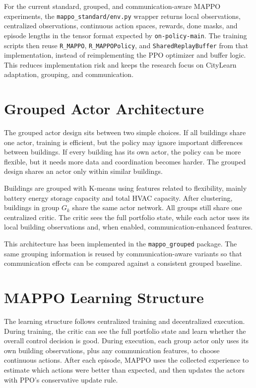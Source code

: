 For the current standard, grouped, and communication-aware MAPPO experiments,
the \texttt{mappo\_standard/env.py} wrapper returns local observations,
centralized observations, continuous action spaces, rewards, done masks, and
episode lengths in the tensor format expected by \texttt{on-policy-main}. The
training scripts then reuse \texttt{R\_MAPPO}, \texttt{R\_MAPPOPolicy}, and
\texttt{SharedReplayBuffer} from that implementation, instead of reimplementing
the PPO optimizer and buffer logic. This reduces implementation risk and keeps
the research focus on CityLearn adaptation, grouping, and communication.

\section{Grouped Actor Architecture}

The grouped actor design sits between two simple choices. If all buildings share
one actor, training is efficient, but the policy may ignore important
differences between buildings. If every building has its own actor, the policy
can be more flexible, but it needs more data and coordination becomes harder.
The grouped design shares an actor only within similar buildings.

Buildings are grouped with K-means using features related to flexibility, mainly
battery energy storage capacity and total HVAC capacity. After clustering,
buildings in group $G_k$ share the same actor network. All groups still share one
centralized critic. The critic sees the full portfolio state, while each actor
uses its local building observations and, when enabled, communication-enhanced
features.

This architecture has been implemented in the \texttt{mappo\_grouped} package.
The same grouping information is reused by communication-aware variants so that
communication effects can be compared against a consistent grouped baseline.

\section{MAPPO Learning Structure}

The learning structure follows centralized training and decentralized
execution. During training, the critic can see the full portfolio state and
learn whether the overall control decision is good. During execution, each
group actor only uses its own building observations, plus any communication
features, to choose continuous actions. After each episode, MAPPO uses the
collected experience to estimate which actions were better than expected, and
then updates the actors with PPO's conservative update rule.

